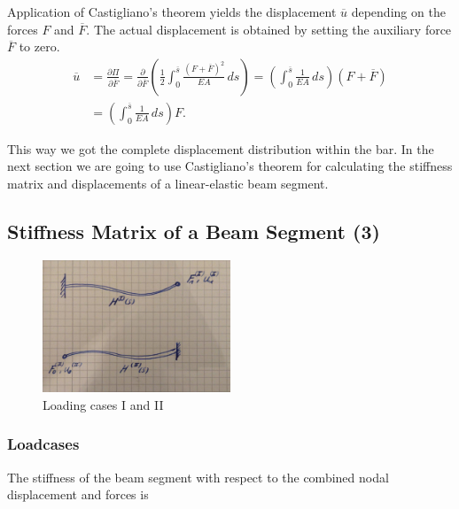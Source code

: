 Application of Castigliano's theorem yields the displacement $\overline{u}$ depending on the forces $F$ and $\overline{F}$.
The actual displacement is obtained by setting the auxiliary force $\overline{F}$ to zero.
%
\begin{align}
\overline{u} &= \frac{\partial \Pi}{\partial \overline{F}} = \frac{\partial}{\partial \overline{F}}\left( \frac{1}{2} \int_{0}^{\overline{s}}\frac{(F + \overline{F})^2}{EA}\,ds \right) = \left(\int_{0}^{\overline{s}}\frac{1}{EA}\,ds \right)\left(F + \overline{F}\right) \\
&= \left(\int_{0}^{\overline{s}}\frac{1}{EA}\,ds \right)F.
\end{align}

This way we got the complete displacement distribution within the bar.
In the next section we are going to use Castigliano's theorem for calculating the stiffness matrix and displacements of a linear-elastic beam segment.

\newpage
\subsection{Stiffness Matrix of a Beam Segment (3)}

\begin{figure}[h]
\centering
\includegraphics[width=0.5\textwidth]{figures/elements/castigliano-beam-cases.jpg}
\caption{Loading cases I and II}
\label{fig:castigliano-beam-cases}
\end{figure}

\subsubsection*{Loadcases}

The stiffness of the beam segment with respect to the combined nodal displacement and forces is

